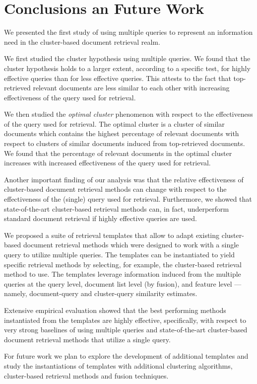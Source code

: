 \section{Conclusions an Future Work}
  \label{sec:conc}

  We presented the first study of using multiple queries to represent
  an information need in the cluster-based document retrieval realm.

  We first studied the cluster hypothesis using multiple queries. We
  found that the cluster hypothesis holds to a larger extent,
  according to a specific test, for highly effective queries than for
  less effective queries. This attests to the fact that top-retrieved
  relevant documents are less similar to each other with increasing effectiveness of the query used for retrieval.

  We then studied the {\em optimal cluster} phenomenon with respect to
  the effectiveness of the query used for retrieval. The optimal
  cluster is a cluster of similar documents which contains the highest
  percentage of relevant documents with respect to clusters of similar
  documents induced from top-retrieved documents. We found that the percentage of relevant documents in the optimal cluster increases with increased effectiveness of the query used for retrieval.

  Another important finding of our analysis was that the relative
  effectiveness of cluster-based document retrieval methods can change
  with respect to the effectiveness of the (single) query used for
  retrieval. Furthermore, we showed that state-of-the-art
  cluster-based retrieval methods can, in fact, underperform standard document retrieval if highly effective queries are used.

  We proposed a suite of retrieval templates that allow to adapt
  existing cluster-based document retrieval methods which were
  designed to work with a single query to utilize multiple
  queries. The templates can be instantiated to yield specific
  retrieval methods by selecting, for example, the cluster-based
  retrieval method to use. The templates leverage information induced from the multiple queries at the query level, document list level (by fusion), and feature level --- namely, document-query and cluster-query similarity estimates.

  Extensive empirical evaluation showed that the best performing
  methods instantiated from the templates are highly effective,
  specifically, with respect to very strong baselines of using multiple queries and state-of-the-art cluster-based document retrieval methods that utilize a single query.

  For future work we plan to explore the development of additional
  templates and study the instantiations of templates with additional
  clustering algorithms, cluster-based retrieval methods and fusion
  techniques.
